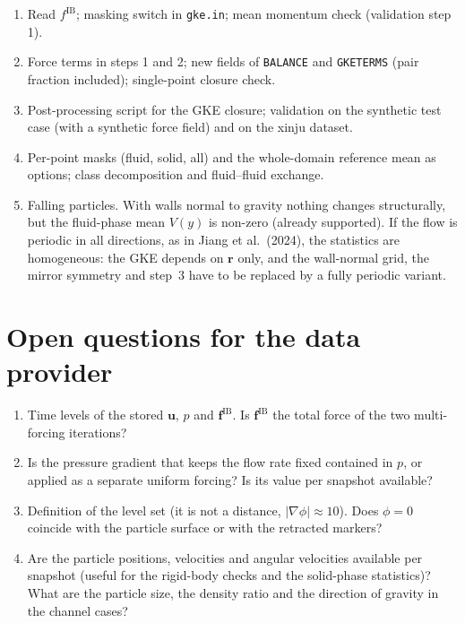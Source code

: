 \documentclass[11pt,a4paper]{article}
\newcommand{\vect}[1]{\boldsymbol{#1}}
\begin{document}
\begin{enumerate}[itemsep=1pt]
\item Read $f^\mathrm{IB}$; masking switch in \texttt{gke.in}; mean
  momentum check (validation step 1).
\item Force terms in steps 1 and 2; new fields of \texttt{BALANCE} and
  \texttt{GKETERMS} (pair fraction included); single-point closure check.
\item Post-processing script for the GKE closure; validation on the synthetic
  test case (with a synthetic force field) and on the xinju dataset.
\item Per-point masks (fluid, solid, all) and the whole-domain reference mean
  as options; class decomposition and fluid--fluid exchange.
\item Falling particles. With walls normal to gravity nothing changes
  structurally, but the fluid-phase mean $V(y)$ is non-zero (already
  supported). If the flow is periodic in all directions, as in Jiang et al.\
  (2024), the statistics are homogeneous: the GKE depends on $\vect r$ only,
  and the wall-normal grid, the mirror symmetry and step~3 have to be replaced
  by a fully periodic variant.
\end{enumerate}

\section{Open questions for the data provider}

\begin{enumerate}[itemsep=1pt]
\item Time levels of the stored $\vect u$, $p$ and $\vect f^\mathrm{IB}$.
  Is $\vect f^\mathrm{IB}$ the total force of the two multi-forcing
  iterations?
\item Is the pressure gradient that keeps the flow rate fixed contained in
  $p$, or applied as a separate uniform forcing? Is its value per snapshot
  available?
\item Definition of the level set (it is not a distance, $|\nabla\phi|\approx10$).
  Does $\phi=0$ coincide with the particle surface or with the retracted
  markers?
\item Are the particle positions, velocities and angular velocities available
  per snapshot (useful for the rigid-body checks and the solid-phase
  statistics)? What are the particle size, the density ratio and the
  direction of gravity in the channel cases?
\end{enumerate}
\end{document}
